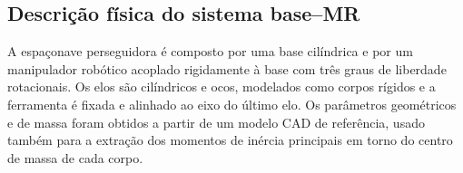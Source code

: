 \subsection{Descrição física do sistema base--MR}
\label{sec:descricao_fisica_base_MR}

A espaçonave perseguidora é composto por uma base cilíndrica e por um manipulador robótico acoplado rigidamente à base com três graus de liberdade rotacionais.
Os elos são cilíndricos e ocos, modelados como corpos rígidos e a ferramenta é fixada e alinhado ao eixo do último elo.
Os parâmetros geométricos e de massa foram obtidos a partir de um modelo CAD de referência, usado também para a extração dos momentos de inércia principais em torno do centro de massa de cada corpo.
